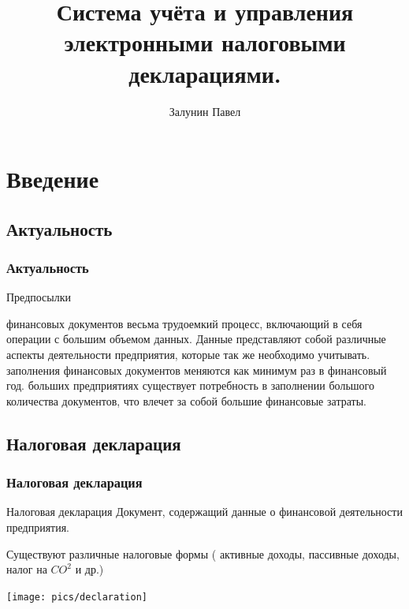 \documentclass[xcolor=pdftex, dvipsnames, table]{beamer}
\title{Система учёта и управления электронными налоговыми декларациями.}
\author{Залунин Павел}
\institute {
  БГУИР\\
  ФИТУ
}
\begin{document}
\frame{\titlepage}

\section[Outline]{}
\frame{\tableofcontents}

\section{Введение}
\subsection{Актуальность}
\begin{frame}
  \frametitle{Актуальность}
  \begin{block}{Предпосылки}
    \begin{itemize}
     финансовых документов весьма трудоемкий процесс, включающий в себя операции с большим объемом данных. Данные представляют собой различные аспекты деятельности предприятия, которые так же необходимо учитывать.
     заполнения финансовых документов меняются как минимум раз в финансовый год.
     больших предприятиях существует потребность в заполнении большого количества документов, что влечет за собой большие финансовые затраты.
    \end{itemize}
  \end{block}
\end{frame}

\subsection{Налоговая декларация}
\begin{frame}
  \frametitle{Налоговая декларация}
  \begin{block}{Налоговая декларация}
    Документ, содержащий данные о финансовой деятельности предприятия.
  \end{block}
  Существуют различные налоговые формы ( активные доходы, пассивные доходы, налог на $CO^{2}$ и др.)
  \begin{center}
    \texttt{[image: pics/declaration]}
  \end{center}
\end{frame}
\end{document}

